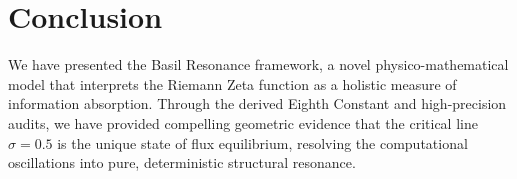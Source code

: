 \documentclass[11pt]{article}
\begin{document}
\section{Conclusion}
We have presented the Basil Resonance framework, a novel physico-mathematical model that interprets the Riemann Zeta function as a holistic measure of information absorption. Through the derived Eighth Constant and high-precision audits, we have provided compelling geometric evidence that the critical line $\sigma = 0.5$ is the unique state of flux equilibrium, resolving the computational oscillations into pure, deterministic structural resonance.
\end{document}
